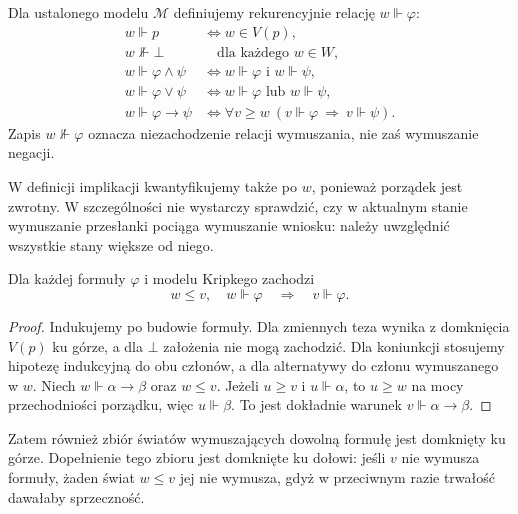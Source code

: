 \begin{definicja}
\label{def:ncl-ipc-forcing}
Dla ustalonego modelu $\mathcal M$ definiujemy
rekurencyjnie relację $w\Vdash\varphi$:
\[
\begin{aligned}
 w\Vdash p &\iff w\in V(p),\\
 w\not\Vdash\bot &\quad\text{dla każdego }w\in W,\\
 w\Vdash\varphi\wedge\psi
 &\iff w\Vdash\varphi\text{ i }w\Vdash\psi,\\
 w\Vdash\varphi\vee\psi
 &\iff w\Vdash\varphi\text{ lub }w\Vdash\psi,\\
 w\Vdash\varphi\to\psi
 &\iff \forall v\geq w\
 (v\Vdash\varphi\ \Longrightarrow\ v\Vdash\psi).
\end{aligned}
\]
Zapis $w\not\Vdash\varphi$ oznacza niezachodzenie
relacji wymuszania, nie zaś wymuszanie negacji.
\end{definicja}
W definicji implikacji kwantyfikujemy także po $w$,
ponieważ porządek jest zwrotny. W szczególności
nie wystarczy sprawdzić, czy w aktualnym stanie
wymuszanie przesłanki pociąga wymuszanie wniosku:
należy uwzględnić wszystkie stany większe od niego.

\begin{lemat}
\label{lem:ncl-ipc-persistence}
Dla każdej formuły $\varphi$ i modelu Kripkego
zachodzi
\[
 w\leq v,\quad w\Vdash\varphi\quad\Longrightarrow\quad
 v\Vdash\varphi.
\]
\end{lemat}
\begin{proof}
Indukujemy po budowie formuły.
Dla zmiennych teza wynika z domknięcia $V(p)$
ku górze, a dla $\bot$ założenia nie mogą zachodzić.
Dla koniunkcji stosujemy hipotezę indukcyjną
do obu członów, a dla alternatywy do członu
wymuszanego w $w$.
Niech $w\Vdash\alpha\to\beta$ oraz $w\leq v$.
Jeżeli $u\geq v$ i $u\Vdash\alpha$, to $u\geq w$
na mocy przechodniości porządku, więc $u\Vdash\beta$.
To jest dokładnie warunek $v\Vdash\alpha\to\beta$.
\end{proof}
Zatem również zbiór światów wymuszających dowolną
formułę jest domknięty ku górze. Dopełnienie tego
zbioru jest domknięte ku dołowi: jeśli $v$ nie
wymusza formuły, żaden świat $w\leq v$ jej nie wymusza,
gdyż w przeciwnym razie trwałość dawałaby sprzeczność.

